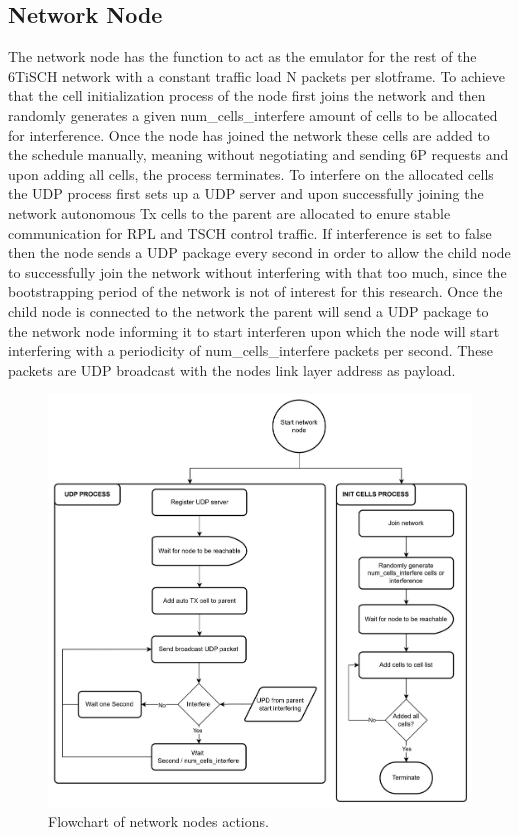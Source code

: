 \documentclass{comnets-thesis}
\begin{document}
\subsection*{Network Node}
The network node has the function to act as the emulator for the rest of the \ac{6TiSCH} network with a constant traffic load N packets per slotframe. To achieve that the cell initialization process of the node first joins the network and then randomly generates a given num\_cells\_interfere amount of cells to be allocated for interference. Once the node has joined the network these cells are added to the schedule manually, meaning without negotiating and sending \ac{6P} requests and upon adding all cells, the process terminates.
To interfere on the allocated cells the UDP process first sets up a \ac{UDP} server and upon successfully joining the network autonomous Tx cells to the parent are allocated to enure stable communication for \ac{RPL} and \ac{TSCH} control traffic. If interference is set to false then the node sends a \ac{UDP} package every second in order to allow the child node to successfully join the network without interfering with that too much, since the bootstrapping period of the network is not of interest for this research. Once the child node is connected to the network the parent will send a \ac{UDP} package to the network node informing it to start interferen upon which the node will start interfering with a periodicity of num\_cells\_interfere packets per second. These packets are \ac{UDP} broadcast with the nodes link layer address as payload.

\begin{figure}[H]
    \centering
    \includegraphics[width=1\textwidth]{./images/network-node-flowchart.png}
    \caption{Flowchart of network nodes actions.}
    \label{fig:network-node-flowchart}
\end{figure}
\end{document}
